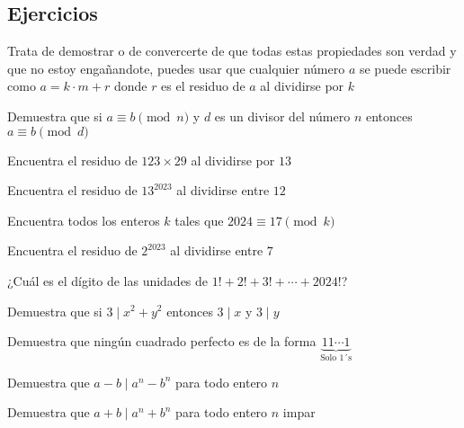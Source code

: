 \documentclass[11pt]{scrartcl}
\begin{document}
\subsection{Ejercicios}
\begin{exercise}
[Importante]
    Trata de demostrar o de convercerte de que todas estas  propiedades son verdad y que no estoy engañandote, puedes usar que cualquier número $a$ se puede escribir como $a=k\cdot m+ r$ donde $r$ es el residuo de $a$ al dividirse por $k$
\end{exercise}
\vspace{0.1cm}
\begin{exercise}
    Demuestra que si $a\equiv b\pmod n$ y $d$ es un divisor del número $n$ entonces $a\equiv b\pmod d$
\end{exercise}
\vspace{0.1cm}
\begin{exercise}
    Encuentra el residuo de $123\times 29$ al dividirse por $13$
\end{exercise}
\vspace{0.1cm}
\begin{exercise}
    Encuentra el residuo de $13^{2023}$ al dividirse entre $12$
\end{exercise}
\vspace{0.1cm}
\begin{exercise}
    Encuentra todos los enteros  $k$ tales que $2024\equiv 17\pmod k$
\end{exercise}
\vspace{0.1cm}
\begin{exercise}
    Encuentra el residuo de $2^{2023}$ al dividirse entre $7$
\end{exercise}
\vspace{0.1cm}

\begin{exercise}
    ¿Cuál es el dígito de las unidades de $1!+2!+3!+\cdots+2024!$?
\end{exercise}
\vspace{0.1cm}
\begin{exercise}
    Demuestra que si $3\mid x^2+y^2$ entonces $3\mid x$ y $3\mid y$
\end{exercise}
\vspace{0.1cm}
\begin{exercise}
    Demuestra que ningún cuadrado perfecto es de la forma $\underbrace{11\cdots1}_{\text{Solo 1´s}}$
\end{exercise}
\begin{exercise}
    Demuestra que $a-b\mid a^n-b^n$ para todo entero $n$
\end{exercise}
\vspace{0.1cm}
\begin{exercise}
    Demuestra que $a+b\mid a^n+b^n$ para todo entero $n$ impar
\end{exercise}
\vspace{0.1cm}
\end{document}
